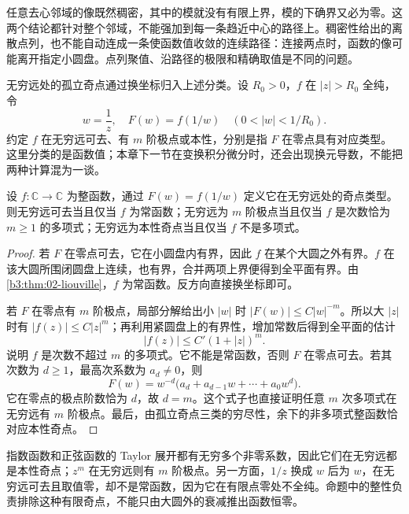 \ProseParagraphBreak

任意去心邻域的像既然稠密，其中的模就没有有限上界，模的下确界又必为零。这两个结论都针对整个邻域，不能强加到每一条趋近中心的路径上。稠密性给出的离散点列，也不能自动连成一条使函数值收敛的连续路径：连接两点时，函数的像可能离开指定小圆盘。点列聚值、沿路径的极限和精确取值是不同的问题。

\ProseParagraphBreak

无穷远处的孤立奇点通过换坐标归入上述分类。设 \(R_0>0\)，\(f\) 在 \(|z|>R_0\) 全纯，令
\[
 w=\frac1z,\quad F(w)=f(1/w)
 \quad(0<|w|<1/R_0).
\]
约定 \(f\) 在无穷远可去、有 \(m\) 阶极点或本性，分别是指 \(F\) 在零点具有对应类型。这里分类的是函数值；本章下一节在变换积分微分时，还会出现换元导数，不能把两种计算混为一谈。

\begin{proposition}[整函数在无穷远的分类]\label{b3:prop:03-entire-at-infinity}
设 \(f:\mathbb C\to\mathbb C\) 为整函数，通过 \(F(w)=f(1/w)\) 定义它在无穷远处的奇点类型。则无穷远可去当且仅当 \(f\) 为常函数；无穷远为 \(m\) 阶极点当且仅当 \(f\) 是次数恰为 \(m\ge1\) 的多项式；无穷远为本性奇点当且仅当 \(f\) 不是多项式。
\end{proposition}
\begin{proof}
若 \(F\) 在零点可去，它在小圆盘内有界，因此 \(f\) 在某个大圆之外有界。\(f\) 在该大圆所围闭圆盘上连续，也有界，合并两项上界便得到全平面有界。由\cref{b3:thm:02-liouville}，\(f\) 为常函数。反方向直接换坐标即可。

若 \(F\) 在零点有 \(m\) 阶极点，局部分解给出小 \(|w|\) 时 \(|F(w)|\le C|w|^{-m}\)。所以大 \(|z|\) 时有 \(|f(z)|\le C|z|^m\)；再利用紧圆盘上的有界性，增加常数后得到全平面的估计
\[
 |f(z)|\le C'(1+|z|)^m.
\]
说明 \(f\) 是次数不超过 \(m\) 的多项式。它不能是常函数，否则 \(F\) 在零点可去。若其次数为 \(d\ge1\)，最高次系数为 \(a_d\ne0\)，则
\[
 F(w)=w^{-d}\bigl(a_d+a_{d-1}w+\cdots+a_0w^d\bigr).
\]
它在零点的极点阶数恰为 \(d\)，故 \(d=m\)。这个式子也直接证明任意 \(m\) 次多项式在无穷远有 \(m\) 阶极点。最后，由孤立奇点三类的穷尽性，余下的非多项式整函数恰对应本性奇点。
\end{proof}

指数函数和正弦函数的 Taylor 展开都有无穷多个非零系数，因此它们在无穷远都是本性奇点；\(z^m\) 在无穷远则有 \(m\) 阶极点。另一方面，\(1/z\) 换成 \(w\) 后为 \(w\)，在无穷远可去且取值零，却不是常函数，因为它在有限点零处不全纯。命题中的整性负责排除这种有限奇点，不能只由大圆外的衰减推出函数恒零。
